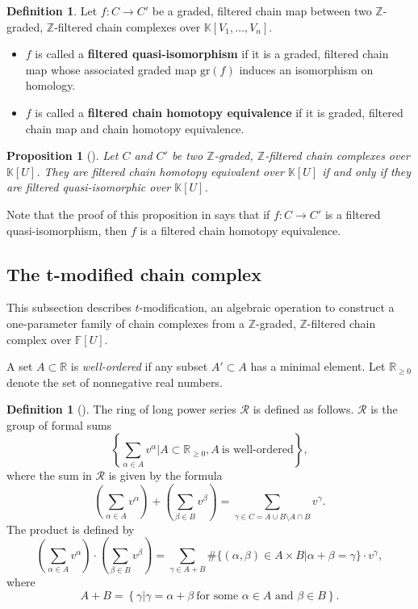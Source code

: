 \documentclass[12pt]{amsart}
\theoremstyle{plain}
\theoremstyle{definition}
\newtheorem{dfn}[thm]{Definition}
\theoremstyle{plain}
\newtheorem{prop}[thm]{Proposition}
\theoremstyle{definition}
\newcommand{\Z}{\mathbb{Z}}
\newcommand{\K}{\mathbb{K}}
\numberwithin{equation}{section}
\begin{document}
\begin{dfn}
Let $f\colon C\to C'$ be a graded, filtered chain map between two $\Z$-graded, $\Z$-filtered chain complexes over $\K[V_1,\dots,V_n]$.
\begin{itemize}
    \item $f$ is called a \textbf{filtered quasi-isomorphism} if it is a graded, filtered chain map whose associated graded map $\mathrm{gr}(f)$ induces an isomorphism on homology.
    \item $f$ is called a \textbf{filtered chain homotopy equivalence} if it is graded, filtered chain map and chain homotopy equivalence.
\end{itemize}
\end{dfn}

\begin{prop}[{\cite[Proposition A.8.1]{Grid-homology-for-knots-and-links}}]
\label{prop:quasi-iso-homotopy}
Let $C$ and $C'$ be two $\mathbb{Z}$-graded, $\mathbb{Z}$-filtered chain complexes over $\mathbb{K}[U]$.
They are filtered chain homotopy equivalent over $\mathbb{K}[U]$ if and only if they are filtered quasi-isomorphic over $\mathbb{K}[U]$.
\end{prop}
Note that the proof of this proposition in \cite{Grid-homology-for-knots-and-links} says that if $f\colon C \to C'$ is a filtered quasi-isomorphism, then $f$ is a filtered chain homotopy equivalence.






\subsection{The t-modified chain complex}
This subsection describes $t$-modification, an algebraic operation to construct a one-parameter family of chain complexes from a $\Z$-graded, $\Z$-filtered chain complex over $\mathbb{F}[U]$.

A set $A\subset\mathbb{R}$ is \textit{well-ordered} if any subset $A'\subset A$ has a minimal element.
Let $\mathbb{R}_{\geq0}$ denote the set of nonnegative real numbers.
\begin{dfn}[{\cite[Definition 3.1]{Concordance-homomorphisms-from-knot-Floer-homology}}]
\label{basedring}
The ring of long power series $\mathcal{R}$ is defined as follows.
$\mathcal{R}$ is the group of formal sums
\[
\left\{\sum_{\alpha\in A}v^\alpha|A\subset\mathbb{R}_{\geq0},A\ \text{is well-ordered}\right\},
\]
where the sum in $\mathcal{R}$ is given by the formula
\[
\left(\sum_{\alpha\in A}v^\alpha\right)+\left(\sum_{\beta\in B}v^\beta\right)=\sum_{\gamma\in C=A\cup B\setminus A\cap B}v^\gamma.
\]
The product is defined by
\[
\left(\sum_{\alpha\in A}v^\alpha\right)\cdot\left(\sum_{\beta\in B}v^\beta\right)=\sum_{\gamma\in A+B}\#\{(\alpha,\beta)\in A\times B|\alpha+\beta=\gamma\}\cdot v^\gamma,
\]
where
\[
A+B=\left\{\gamma|\gamma=\alpha+\beta\ \text{for some }\alpha\in A\text{ and }\beta\in B\right\}.
\]
\end{dfn}
\end{document}
